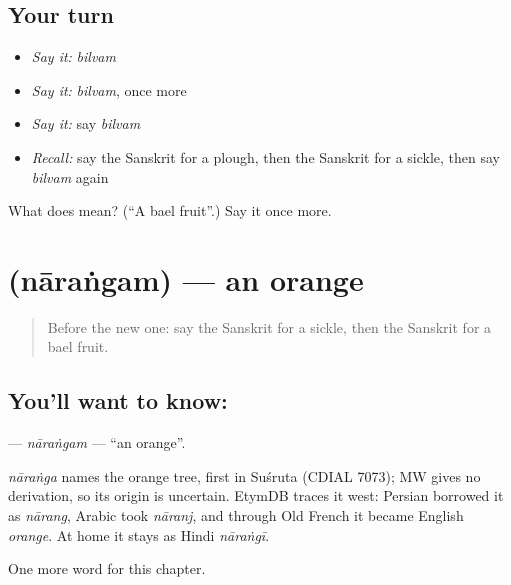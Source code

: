\subsection*{Your turn}
\begin{itemize}
\raggedright
  \item \emph{Say it:} \emph{bilvam}
  \item \emph{Say it:} \emph{bilvam}, once more
  \item \emph{Say it:} say \emph{bilvam}
  \item \emph{Recall:} say the Sanskrit for a plough, then the Sanskrit for a sickle, then say \emph{bilvam} again
\end{itemize}

\begin{tcolorbox}[breakable,colback=teal!4,colframe=teal!35!black,title={Before you move on}]
What does  mean? (\textquotedblleft{}A bael fruit\textquotedblright{}.) Say it once more.
\end{tcolorbox}
\section[\texorpdfstring{\sk{नारंगम्} (nāraṅgam)}{नारंगम् (nāraṅgam)}]{ (nāraṅgam) — an orange}

\label{lesson:SA-C219-narangam}



\begin{quote}
Before the new one: say the Sanskrit for a sickle, then the Sanskrit for a bael fruit.
\end{quote}

\subsection*{You'll want to know: }
\textbf{} — \emph{nāraṅgam} — \textquotedblleft{}an orange\textquotedblright{}.

\begin{cousinweb}
\emph{nāraṅga} names the orange tree, first in Suśruta (CDIAL 7073); MW gives no derivation, so its origin is uncertain. EtymDB traces it west: Persian borrowed it as \emph{nārang}, Arabic took \emph{nāranj}, and through Old French it became English \emph{orange}. At home it stays as Hindi \emph{nāraṅgī}.
\end{cousinweb}

\begin{grammarlens}[title={What you've built}]
One more word for this chapter.
\end{grammarlens}

